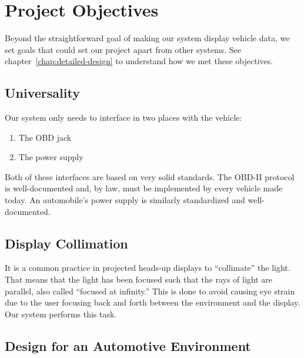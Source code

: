 \chapter{Project Objectives}



Beyond the straightforward goal of making our system display vehicle data, we
set goals that could set our project apart from other systems. See
chapter~\ref{chap:detailed-design} to understand how we met these objectives.

\section{Universality}

Our system only needs to interface in two places with the vehicle:

\begin{enumerate}

\item The OBD jack
\item The power supply

\end{enumerate}

Both of these interfaces are based on very solid standards. The OBD-II protocol
is well-documented and, by law, must be implemented by every vehicle made
today. An automobile's power supply is similarly standardized and
well-documented.

\section{Display Collimation}

It is a common practice in projected heads-up displays to ``collimate'' the
light. That means that the light has been focused such that the rays of light
are parallel, also called ``focused at infinity.'' This is done to avoid
causing eye strain due to the user focusing back and forth between the
environment and the display. Our system performs this task.

\section{Design for an Automotive Environment}

